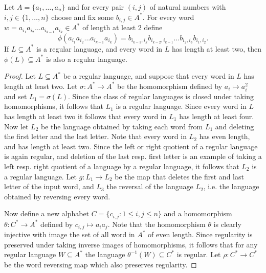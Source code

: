 \documentclass[10pt,a4paper]{amsart}
\begin{document}
\begin{lemma}\label{lem_PresRegular}
Let $A = \{a_1, \ldots, a_n \}$ and for every pair $(i,j)$ of natural numbers with 
$i,j \in \{1, \ldots, n \}$  
choose and fix some $b_{i,j} \in A^*$. 
For every word $w = a_{i_1} a_{i_2} \ldots a_{i_{k-1}} a_{i_k}\in A^*$ of length at least $2$ define  
\[
\phi(a_{i_1} a_{i_2} \ldots a_{i_{k-1}} a_{i_k}) = 
b_{i_{k-1},i_k} 
b_{i_{k-2},i_{k-1}} 
\ldots 
b_{i_2,i_3} 
b_{i_1,i_2}.  
\]
If $L \subseteq A^*$ is a regular language, and every word in $L$ has length at least two, then $\phi(L) \subseteq A^*$ is also a regular language.     
  \end{lemma}

\begin{proof} 
Let $L \subseteq A^*$ be a regular language, and suppose that every word in $L$ has length at least two. 
Let $\sigma:A^* \rightarrow A^*$ be the homomorphism defined by $a_i \mapsto a_i^2$ and set $L_1 = \sigma(L)$. Since the class of regular languages is closed under taking homomorphisms, it follows that $L_1$ is a regular language.     
Since every word in $L$ has length at least two it follows that every word in $L_1$ has length at least four. 
Now let $L_2$ be the language obtained by taking each word from $L_1$ and deleting the first letter and the last letter. Note that every word in $L_2$ has even length, and has length at least two.   
Since the left or right quotient of a regular language is again regular, and deletion of the last resp. first letter is an example of taking a left resp. right quotient of a language by a regular language, it follows that $L_2$ is a regular language.  
Let $g:L_1 \rightarrow L_2$ be the map that deletes the first and last letter of the input word, and $L_3$ the reversal of the language $L_2$, i.e. the language obtained by reversing every word.

Now define a new alphabet $C = \{ c_{i,j} : 1 \leq i,j \leq n \}$ and a homomorphism $\theta:C^* \rightarrow A^*$ defined by $c_{i,j} \mapsto a_i a_j$.     
Note that the homomorphism $\theta$ is clearly injective with image the set of all word in $A^*$ of even length.   
Since regularity is preserved under taking inverse images of homomorphisms, it follows that for any regular language $W \subseteq A^*$ the language $\theta^{-1}(W) \subseteq C^*$ is regular.   
Let $\rho:C^* \rightarrow C^*$ be the word reversing map which also preserves regularity. 


\end{proof}
\end{document}
